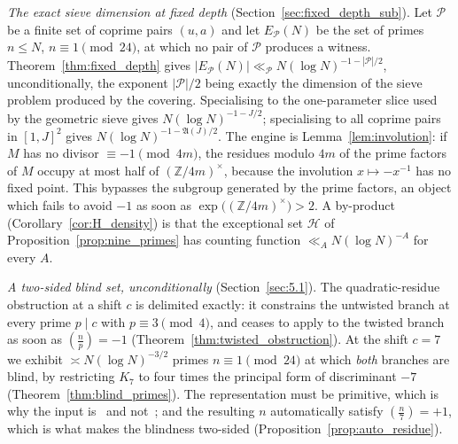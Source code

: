 \documentclass[11pt, a4paper]{article}
\theoremstyle{plain}
\theoremstyle{definition}
\newcommand{\Z}{\mathbb{Z}}
\newcommand{\leg}[2]{\left(\frac{#1}{#2}\right)}
\begin{document}
\emph{The exact sieve dimension at fixed depth} (Section~\ref{sec:fixed_depth_sub}). Let $\mathcal{P}$ be a finite set of coprime pairs $(u,a)$ and let $E_{\mathcal{P}}(N)$ be the set of primes $n\le N$, $n\equiv1\pmod{24}$, at which no pair of $\mathcal{P}$ produces a witness. Theorem~\ref{thm:fixed_depth} gives $|E_{\mathcal{P}}(N)|\ll_{\mathcal{P}}N(\log N)^{-1-|\mathcal{P}|/2}$, unconditionally, the exponent $|\mathcal{P}|/2$ being exactly the dimension of the sieve problem produced by the covering. Specialising to the one-parameter slice used by the geometric sieve gives $N(\log N)^{-1-J/2}$; specialising to all coprime pairs in $[1,J]^{2}$ gives $N(\log N)^{-1-\mathfrak{A}(J)/2}$. The engine is Lemma~\ref{lem:involution}: if $M$ has no divisor $\equiv-1\pmod{4m}$, the residues modulo $4m$ of the prime factors of $M$ occupy at most half of $(\Z/4m)^{\times}$, because the involution $x\mapsto-x^{-1}$ has no fixed point. This bypasses the subgroup generated by the prime factors, an object which fails to avoid $-1$ as soon as $\exp\big((\Z/4m)^{\times}\big)>2$. A by-product (Corollary~\ref{cor:H_density}) is that the exceptional set $\mathcal{H}$ of Proposition~\ref{prop:nine_primes} has counting function $\ll_A N(\log N)^{-A}$ for every $A$.

\emph{A two-sided blind set, unconditionally} (Section~\ref{sec:5.1}). The quadratic-residue obstruction at a shift $c$ is delimited exactly: it constrains the untwisted branch at every prime $p\mid c$ with $p\equiv3\pmod4$, and ceases to apply to the twisted branch as soon as $\leg{n}{p}=-1$ (Theorem~\ref{thm:twisted_obstruction}). At the shift $c=7$ we exhibit $\asymp N(\log N)^{-3/2}$ primes $n\equiv1\pmod{24}$ at which \emph{both} branches are blind, by restricting $K_7$ to four times the principal form of discriminant $-7$ (Theorem~\ref{thm:blind_primes}). The representation must be primitive, which is why the input is~\cite{fuchs2025} and not~\cite{iwaniec1972,iwaniec1974}; and the resulting $n$ automatically satisfy $\leg n7=+1$, which is what makes the blindness two-sided (Proposition~\ref{prop:auto_residue}).
\end{document}

